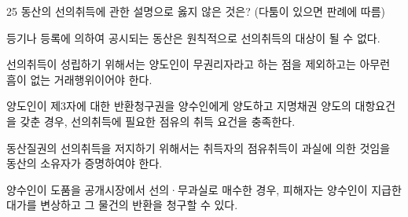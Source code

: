 \begin{question}{25}
동산의 선의취득에 관한 설명으로 옳지 않은 것은? (다툼이 있으면 판례에 따름)
\begin{choices}
  \item 등기나 등록에 의하여 공시되는 동산은 원칙적으로 선의취득의 대상이 될 수 없다.
  \item 선의취득이 성립하기 위해서는 양도인이 무권리자라고 하는 점을 제외하고는 아무런 흠이 없는 거래행위이어야 한다.
  \item 양도인이 제3자에 대한 반환청구권을 양수인에게 양도하고 지명채권 양도의 대항요건을 갖춘 경우, 선의취득에 필요한 점유의 취득 요건을 충족한다.
  \item 동산질권의 선의취득을 저지하기 위해서는 취득자의 점유취득이 과실에 의한 것임을 동산의 소유자가 증명하여야 한다.
  \item 양수인이 도품을 공개시장에서 선의·무과실로 매수한 경우, 피해자는 양수인이 지급한 대가를 변상하고 그 물건의 반환을 청구할 수 있다.
\end{choices}
\end{question}
